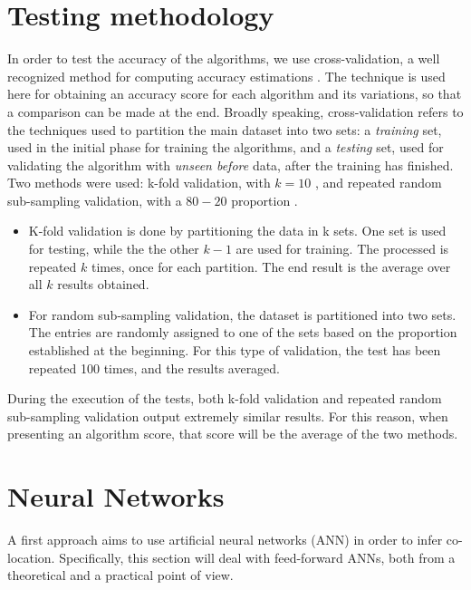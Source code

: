 \section{Testing methodology}

In order to test the accuracy of the algorithms, we use cross-validation, a well recognized method for computing accuracy estimations \cite{kohavi1995study}. The technique is used here for obtaining an accuracy score for each algorithm and its variations, so that a comparison can be made at the end. Broadly speaking, cross-validation refers to the techniques used to partition the main dataset into two sets: a \textit{training} set, used in the initial phase for training the algorithms, and a \textit{testing} set, used for validating the algorithm with \textit{unseen before} data, after the training has finished. Two methods were used: k-fold validation, with $k = 10$ \cite{kohavi1995study}, and repeated random sub-sampling validation, with a $80-20$ proportion \cite{segaran}. 

\begin{itemize}
  \item K-fold validation is done by partitioning the data in k sets. One set is used for testing, while the the other $k-1$ are used for training. The processed is repeated $k$ times, once for each partition. The end result is the average over all $k$ results obtained. 
  \item For random sub-sampling validation, the dataset is partitioned into two sets. The entries are randomly assigned to one of the sets based on the proportion established at the beginning. For this type of validation, the test has been repeated 100 times, and the results averaged.   
\end{itemize}

During the execution of the tests, both k-fold validation and repeated random sub-sampling validation output extremely similar results. For this reason, when presenting an algorithm score, that score will be the average of the two methods. 


\section{Neural Networks}

A first approach aims to use artificial neural networks (ANN) in order to infer co-location. Specifically, this section will deal with feed-forward ANNs, both from a theoretical and a practical point of view. 


